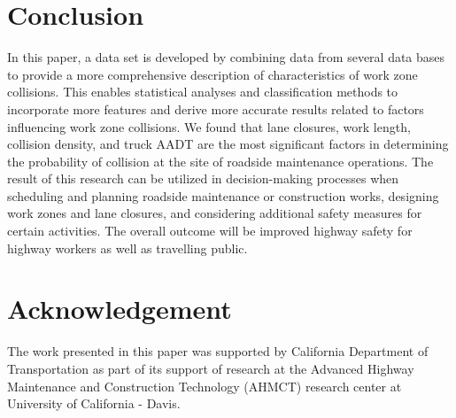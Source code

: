 \documentclass[10pt,a4paper]{article}
\begin{document}

\section{Conclusion} \label{se:conclusion}
In this paper, a data set is developed by combining data from several data bases to provide a more comprehensive description of characteristics of work zone collisions. This enables statistical analyses and classification methods to incorporate more features and derive more accurate results related to factors influencing work zone collisions. We found that lane closures, work length, collision density, and truck  AADT are the most significant factors in determining the probability of collision at the site of roadside maintenance operations. The result of this research can be utilized in decision-making processes when scheduling and planning roadside maintenance or construction works, designing work zones and lane closures, and considering additional safety measures for certain activities. The overall outcome will be improved highway safety for highway workers as well as travelling public.

\section{Acknowledgement} \label{se:acknowledgement}
The work presented in this paper was supported by California Department of Transportation as part of its support of research  at the Advanced Highway Maintenance and Construction Technology (AHMCT) research center at University of California - Davis.
\end{document}
